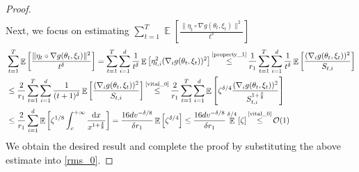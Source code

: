\documentclass[standalone]{article}
\DeclareMathOperator{\Expect}{\mathbb{E}}
\begin{document}
\begin{proof}
\begin{align}
\end{align}
Next, we focus on estimating \(\sum_{t=1}^{T}\Expect\left[\frac{\|\eta_t\circ \nabla g(\theta_{t},\xi_{t})\|^{2}}{t^{\delta}}\right]\)
\begin{align*}
&\sum_{t=1}^{T}\Expect\left[\frac{\|\eta_t\circ \nabla g(\theta_{t},\xi_{t})\|^{2}}{t^{\delta}}\right]=\sum_{t=1}^{T}   \sum_{i=1}^{d}\frac{1}{t^{\delta}}\Expect\left[\eta_{t,i}^{2}(\nabla_{i}g(\theta_{t},\xi_{t}))^{2}\right]\mathop{\le}^{\text{\cref{property_1}}}\frac{1}{r_1}\sum_{t=1}^{T}   \sum_{i=1}^{d}\frac{1}{t^{\delta}}\Expect\left[\frac{(\nabla_{i}g(\theta_{t},\xi_{t}))^{2}}{S_{t,i}}\right]\\&\le \frac{2}{r_1}\sum_{t=1}^{T}   \sum_{i=1}^{d}\frac{1}{(t+1)^{\delta}}\Expect\left[\frac{(\nabla_{i}g(\theta_{t},\xi_{t}))^{2}}{S_{t,i}}\right]\mathop{\le}^{\text{\cref{vital_0}}}\frac{2}{r_1}\sum_{t=1}^{T}   \sum_{i=1}^{d}\Expect\left[\zeta^{\delta/4}\frac{(\nabla_{i}g(\theta_{t},\xi_{t}))^{2}}{S^{1+\frac{\delta}{8}}_{t,i}}\right]\\&\le\frac{2}{r_1}\sum_{i=1}^{d}\Expect\left[\zeta^{1/8}\int_{v}^{+\infty}\frac{\text{d}x}{x^{1+\frac{\delta}{8}}}\right]=\frac{16dv^{-\delta/8}}{\delta r_1}\Expect\left[\zeta^{\delta/4}\right]\le \frac{16dv^{-\delta/8}}{\delta r_1}\Expect^{\delta/4}\left[\zeta\right]\mathop{\le}^{\text{\cref{vital_0}}} \mathcal{O}(1)%
\end{align*}
We obtain the desired result and complete the proof by substituting the above estimate into \cref{rms_0}. 
\end{proof}
\end{document}
